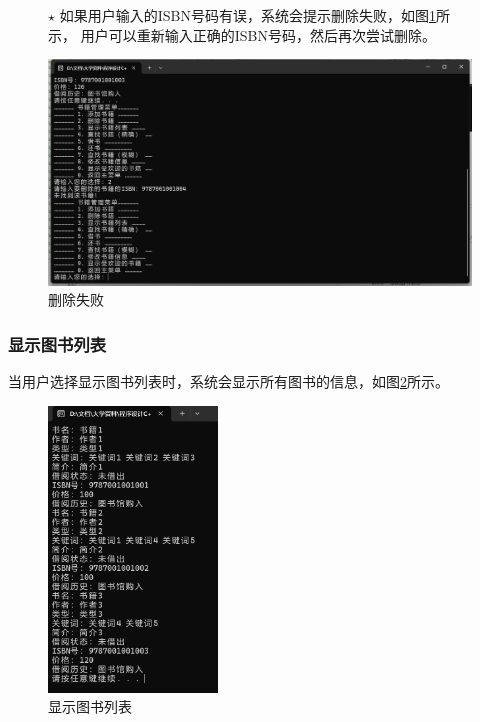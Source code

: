 \documentclass[12pt,twoside]{ctexart}
\begin{document}
\begin{figure}[H]
    \begin{minipage}[c]{0.45\textwidth}
        $\star$ 如果用户输入的ISBN号码有误，系统会提示删除失败，如图\ref{fig:DeleteFail}所示，
        用户可以重新输入正确的ISBN号码，然后再次尝试删除。
    \end{minipage}
    \hfill
    \begin{minipage}[c]{0.5\textwidth}
        \centering
        \includegraphics[width=\textwidth]{Book/DeleteBookFail.png}
        \caption{删除失败}
        \label{fig:DeleteFail}
    \end{minipage}
\end{figure}

\subsubsection{显示图书列表}

当用户选择显示图书列表时，系统会显示所有图书的信息，如图\ref{fig:Show}所示。

\begin{figure}[H]
    \centering
    \includegraphics[width=0.4\textwidth]{Book/Show.png}
    \caption{显示图书列表}
    \label{fig:Show}
\end{figure}
\end{document}
